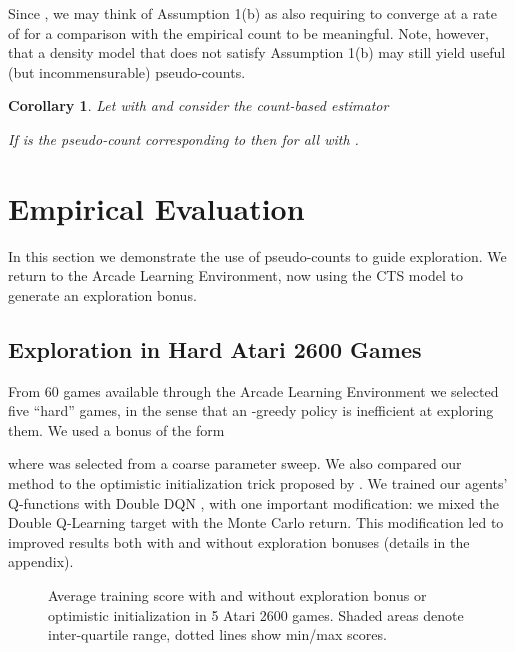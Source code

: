 \documentclass{article}
\newtheorem{cor}{Corollary}
\begin{document}
Since , we may think of Assumption 1(b) as also requiring  to converge at a rate of  for a comparison with the empirical count  to be meaningful. Note, however, that a density model that does not satisfy Assumption 1(b) may still yield useful (but incommensurable) pseudo-counts.

\begin{cor}\label{cor:atomic_models}
Let  with  and consider the count-based estimator

If  is the pseudo-count corresponding to  then  for all 
with .
\end{cor}

\section{Empirical Evaluation}

In this section we demonstrate the use of pseudo-counts to guide exploration. We return to the
Arcade Learning Environment, now using the CTS model to generate an exploration bonus.

\subsection{Exploration in Hard Atari 2600 Games}

From 60 games available through the Arcade Learning Environment we selected five ``hard'' games,
in the sense that an -greedy policy is inefficient at exploring them. We used a bonus
of the form

where  was selected from a coarse parameter sweep. 
We also compared our method to the optimistic initialization trick proposed by
\citet{machado14domainindependent}.
We trained our agents' Q-functions
with Double DQN \citep{vanhasselt16deep}, with one important modification: we mixed the 
Double Q-Learning target
with the Monte Carlo return. This modification led to improved results both with
and without exploration bonuses (details in the appendix).

\begin{figure*}
\caption{Average training score with and without exploration bonus or optimistic initialization in 5 Atari 2600 games. Shaded areas denote inter-quartile range, dotted lines show min/max scores. 
\label{fig:5_hard}} 
\end{figure*}
\end{document}
